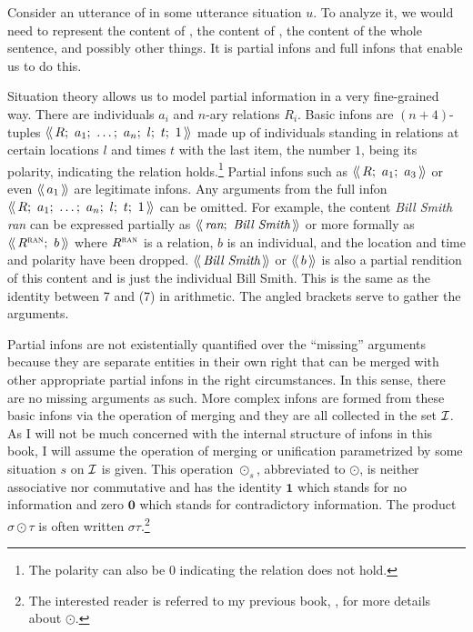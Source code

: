 Consider an utterance of  in some utterance situation $u$. To analyze it, we would need to represent the content of , the content of , the content of the whole sentence, and possibly other things. It is partial infons and full infons that enable us to do this.

Situation theory allows us to model partial information in a very fine-grained way. There are individuals $a_i$ and $n$-ary relations $R_i$. Basic infons are $(n+4)$-tuples $\soa{R;\ a_1;\ \ldots;\ a_n;\ l;\ t;\ 1}$ made up of individuals standing in relations at certain locations $l$ and times $t$ with the last item, the number $1$, being its polarity, indicating the relation holds.\footnote{The polarity can also be $0$ indicating the relation does not hold.} Partial infons such as $\soa{R;\ a_1;\ a_3}$ or even $\langle\!\langle\,a_1\,\rangle\!\rangle$ are legitimate infons. Any arguments from the full infon $\soa{R;\ a_1;\ \ldots;\ a_n;\ l;\ t;\ 1}$ can be omitted. For example, the content  \emph{Bill Smith ran} can be expressed partially as $\soa{\emph{ran};\ \emph{Bill Smith}}$ or more formally as $\soa{R^{\Expression{ran}};\ b}$ \label{page:relation} where  $R^{\Expression{ran}}$ is a relation, $b$ \label{page:Bill} is an individual, and the location and time and polarity have been dropped. $\langle\!\langle\,\emph{Bill Smith}\,\rangle\!\rangle$ or $\langle\!\langle\,b\,\rangle\!\rangle$ is also a partial rendition of this content and is just the individual Bill Smith. This is the same as the identity between 7  and (7) in arithmetic. The angled brackets serve to gather the arguments.

Partial infons are not existentially quantified over the ``missing'' arguments because they are separate entities in their own right that can be merged with other appropriate partial infons in the right circumstances. In this sense, there are no missing arguments as such. More complex infons are formed from these basic infons via the operation of merging and they are all collected in the set $\cal I$. As I will not be much concerned with the internal structure of infons in this book, I will assume the operation of merging or unification parametrized by some situation $s$ on $\cal I$ is given. This operation $\odot_{s}$, abbreviated to $\odot$, is neither associative nor commutative and has the identity $\mathbf{1}$ which stands for no information and zero $\mathbf{0}$ which stands for contradictory information. The product $\sigma \odot \tau$ is often written $\sigma\tau$.\footnote{The interested reader is referred to my previous book, \citet[Chapter~2]{parikh:le}, for more details about $\odot$.}


